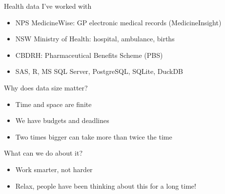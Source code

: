 \documentclass[aspectratio=169,12pt,usepdftitle=false]{beamer} %
\begin{document}
\begin{frame}{Health data I've worked with}
    \begin{itemize}
	\item NPS MedicineWise: GP electronic medical records (MedicineInsight)
	\item NSW Ministry of Health: hospital, ambulance, births
	\item CBDRH: Pharmaceutical Benefits Scheme (PBS)
	\item SAS, R, MS SQL Server, PostgreSQL, SQLite, DuckDB
    \end{itemize}
\end{frame}

\begin{frame}{Why does data size matter?}
    \begin{itemize}
        \item Time and space are finite
	\item We have budgets and deadlines
	\item Two times bigger can take more than twice the time
    \end{itemize}
\end{frame}


\begin{frame}{What can we do about it?}
    \begin{itemize}
	\item Work smarter, not harder
	\item Relax, people have been thinking about this for a long time!
    \end{itemize}
\end{frame}

{
\begin{frame}[plain]
\end{frame}
}
\end{document}
